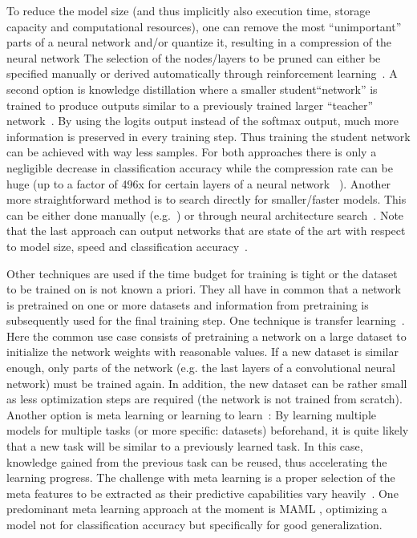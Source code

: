 \documentclass{article}
\begin{document}
To reduce the model size (and thus implicitly also execution time, storage capacity and computational resources), one can remove the most ``unimportant'' parts of a neural network and/or quantize it, resulting in a compression of the neural network The selection of the nodes/layers to be pruned can either be specified manually or derived automatically through reinforcement learning~\cite{han15,han18}. A second option is knowledge distillation where a smaller student``network'' is trained to produce outputs similar to a previously trained larger ``teacher'' network~\cite{hinton15,phuong19}. By using the logits output instead of the softmax output, much more information is preserved in every training step. Thus training the student network can be achieved with way less samples. For both approaches there is only a negligible decrease in classification accuracy while the compression rate can be huge (up to a factor of 496x for certain layers of a neural network ~\cite{reagan18}). Another more straightforward method is to search directly for smaller/faster models. This can be either done manually (e.g.~\cite{howard17}) or through neural architecture search~\cite{elsken19}. Note that the last approach can output networks that are state of the art with respect to model size, speed and classification accuracy~\cite{tan19}.

Other techniques are used if the time budget for training is tight or the dataset to be trained on is not known a priori. They all have in common that a network is pretrained on one or more datasets and information from pretraining is subsequently used for the final training step. One technique is transfer learning~\cite{pan10}. Here the common use case consists of pretraining a network on a large dataset to initialize the network weights with reasonable values. If a new dataset is similar enough, only parts of the network (e.g. the last layers of a convolutional neural network) must be trained again. In addition, the new dataset can be rather small as less optimization steps are required (the network is not trained from scratch). Another option is meta learning or learning to learn~\cite{santoro16,hutter19}: By learning multiple models for multiple tasks (or more specific: datasets) beforehand, it is quite likely that a new task will be similar to a previously learned task. In this case, knowledge gained from the previous task can be reused, thus accelerating the learning progress. The challenge with meta learning is a proper selection of the meta features to be extracted as their predictive capabilities vary heavily~\cite{bilalli17}. One predominant meta learning approach at the moment is MAML \cite{finn17}, optimizing a model not for classification accuracy but specifically for good generalization. 
\end{document}
